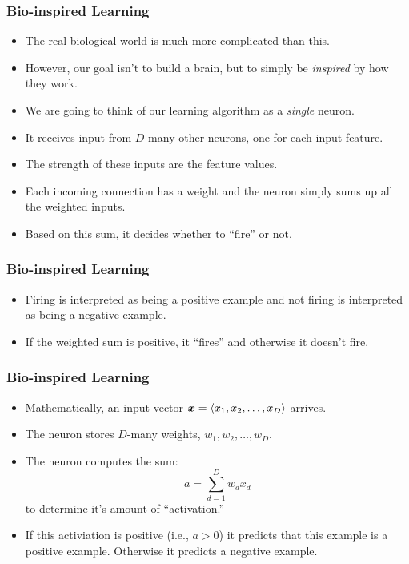 \documentclass[trans]{beamer}
\begin{document}
\begin{frame}
  \frametitle{Bio-inspired Learning}
\begin{itemize}
\item The real biological world is much more complicated than this.
\item However, our goal isn't to build a brain, but to simply be
\emph{inspired} by how they work. 
\item We are going to think of our
learning algorithm as a \emph{single} neuron. 
\item It receives input from
$D$-many other neurons, one for each input feature.  
\item The strength of
these inputs are the feature values.  
\item Each incoming connection has a weight
and the neuron simply sums up all the weighted inputs.
\item  Based on this
sum, it decides whether to ``fire'' or not.
\end{itemize}
\end{frame}
\begin{frame}
  \frametitle{Bio-inspired Learning}
\begin{itemize}
\item  Firing is interpreted as
being a positive example and not firing is interpreted as being a
negative example. 
\item If the weighted sum is positive, it
``fires'' and otherwise it doesn't fire.
\end{itemize}
\end{frame}
\begin{frame}
  \frametitle{Bio-inspired Learning}
\begin{itemize}
\item
Mathematically, an input vector ${\boldsymbol{x}} = \langle x_1, x_2, \dots, x_D
\rangle$ arrives. 
\item The neuron stores $D$-many weights, $w_1, w_2,
\dots, w_D$.  
\item The neuron computes the sum:
\begin{equation} \label{eq:perc:sum}
a = \sum_{d=1}^D w_d x_d
\end{equation}
to determine it's amount of ``activation.''
\item  If this activiation is
positive (i.e., $a > 0$) it predicts that this example is a positive
example.  Otherwise it predicts a negative example.
\end{itemize}
\end{frame}
\end{document}
